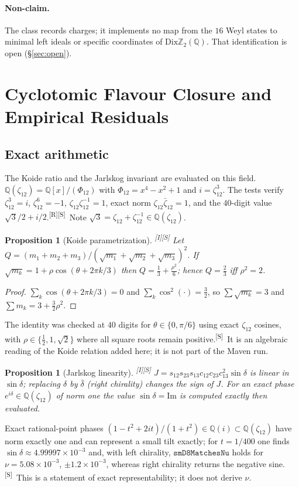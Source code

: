 \documentclass[11pt,a4paper]{article}
\newtheorem{proposition}[theorem]{Proposition}
\theoremstyle{definition}
\theoremstyle{remark}
\newcommand{\Q}{\mathbb{Q}}
\newcommand{\DZ}{\mathrm{Dix}\mathbb{Z}_2(\mathbb{Q})}
\newcommand{\code}[1]{\texttt{#1}}
\newcommand{\tR}{\textsuperscript{[R]}}
\newcommand{\tS}{\textsuperscript{[S]}}
\newcommand{\tI}{\textsuperscript{[I]}}
\begin{document}
\paragraph{Non-claim.} The class records charges; it implements no map from the $16$ Weyl states to minimal left ideals or specific coordinates of $\DZ$. That identification is open (\S\ref{sec:open}).

\section{Cyclotomic Flavour Closure and Empirical Residuals}\label{sec:flavour}
\subsection{Exact arithmetic}\label{sec:exact}
The Koide ratio \cite{Koide} and the Jarlskog invariant \cite{Jarlskog} are evaluated on this field. $\Q(\zeta_{12})=\Q[x]/(\Phi_{12})$ with $\Phi_{12}=x^4-x^2+1$ and $i=\zeta_{12}^3$. The tests verify $\zeta_{12}^3=i$, $\zeta_{12}^6=-1$, $\zeta_{12}\zeta_{12}^{-1}=1$, exact norm $\zeta_{12}\bar\zeta_{12}=1$, and the $40$-digit value $\sqrt3/2+i/2$.\tR\tS\ Note $\sqrt3=\zeta_{12}+\zeta_{12}^{-1}\in\Q(\zeta_{12})$.

\begin{proposition}[Koide parametrization]\label{prop:koide}\tI\tS
Let $Q=(m_1+m_2+m_3)/(\sqrt{m_1}+\sqrt{m_2}+\sqrt{m_3})^2$. If $\sqrt{m_k}=1+\rho\cos(\theta+2\pi k/3)$ then $Q=\tfrac13+\tfrac{\rho^2}{6}$; hence $Q=\tfrac23$ iff $\rho^2=2$.
\end{proposition}
\begin{proof}
$\sum_k\cos(\theta+2\pi k/3)=0$ and $\sum_k\cos^2(\cdot)=\tfrac32$, so $\sum\sqrt{m_k}=3$ and $\sum m_k=3+\tfrac32\rho^2$.
\end{proof}
\noindent The identity was checked at $40$ digits for $\theta\in\{0,\pi/6\}$ using exact $\zeta_{12}$ cosines, with $\rho\in\{\tfrac12,1,\sqrt2\}$ where all square roots remain positive.\tS\ It is an algebraic reading of the Koide relation added here; it is not part of the Maven run.

\begin{proposition}[Jarlskog linearity]\label{prop:J}\tI\tS
$J=s_{12}s_{23}s_{13}c_{12}c_{23}c_{13}^2\sin\delta$ is linear in $\sin\delta$; replacing $\delta$ by $\bar\delta$ (right chirality) changes the sign of $J$. For an exact phase $e^{i\delta}\in\Q(\zeta_{12})$ of norm one the value $\sin\delta=\mathrm{Im}$ is computed exactly then evaluated.
\end{proposition}
\noindent Exact rational-point phases $(1-t^2+2it)/(1+t^2)\in\Q(i)\subset\Q(\zeta_{12})$ have norm exactly one and can represent a small tilt exactly; for $t=1/400$ one finds $\sin\delta\approx 4.99997\times10^{-3}$ and, with left chirality, $\code{smD8MatchesNu}$ holds for $\nu=5.08\times10^{-3}$, $\pm1.2\times10^{-3}$, whereas right chirality returns the negative sine.\tS\ This is a statement of exact representability; it does not derive $\nu$.
\end{document}
